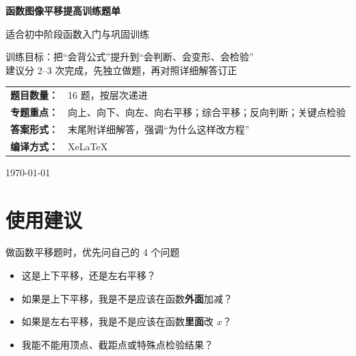 \documentclass[11pt,a4paper,fontset=fandol]{ctexart}
\theoremstyle{formalexample}
\begin{document}
\thispagestyle{empty}
\begin{titlepage}
\centering
\vspace*{0.9cm}
\begin{tcolorbox}[
  enhanced,
  width=0.92\textwidth,
  colback=white,
  colframe=mainblue,
  boxrule=1pt,
  arc=0mm,
  left=6mm,
  right=6mm,
  top=8mm,
  bottom=8mm
]
\centering
{\fontsize{24}{30}\selectfont\bfseries 函数图像平移提高训练题单\par}
\vspace{0.6cm}
{\fontsize{17}{22}\selectfont 适合初中阶段函数入门与巩固训练\par}

\vspace{1cm}
\begin{tcolorbox}[colback=lightblue,colframe=mainblue,width=0.84\textwidth,boxrule=1pt]
\centering
{\large 训练目标：把“会背公式”提升到“会判断、会变形、会检验”}\\[0.35em]
{\normalsize 建议分 2--3 次完成，先独立做题，再对照详细解答订正}
\end{tcolorbox}

\vspace{1cm}
\renewcommand{\arraystretch}{1.42}
\begin{tabular}{>{\bfseries}p{3.5cm}p{8cm}}
题目数量： & 16 题，按层次递进 \\
专题重点： & 向上、向下、向左、向右平移；综合平移；反向判断；关键点检验 \\
答案形式： & 末尾附详细解答，强调“为什么这样改方程” \\
编译方式： & XeLaTeX \\
\end{tabular}

\vspace{0.9cm}
{\large \today\par}
\end{tcolorbox}
\end{titlepage}

\tableofcontents
\newpage

\section{使用建议}

\begin{goalbox}{做函数平移题时，优先问自己的 4 个问题}
\begin{itemize}
  \item 这是上下平移，还是左右平移？
  \item 如果是上下平移，我是不是应该在函数\textbf{外面}加减？
  \item 如果是左右平移，我是不是应该在函数\textbf{里面}改 $x$？
  \item 我能不能用顶点、截距点或特殊点检验结果？
\end{itemize}
\end{goalbox}
\end{document}
